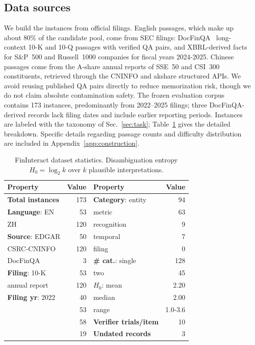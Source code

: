 \subsection{Data sources}
\label{sec:stats}
We build the instances from official filings. English passages, which make up about 80\% of the candidate pool, come from SEC filings: DocFinQA~\citep{reddy2024docfinqa} long-context 10-K and 10-Q passages with verified QA pairs, and XBRL-derived facts for S\&P~500 and Russell~1000 companies for fiscal years 2024-2025. Chinese passages come from the A-share annual reports of SSE~50 and CSI~300 constituents, retrieved through the CNINFO and akshare structured APIs. We avoid reusing published QA pairs directly to reduce memorization risk, though we do not claim absolute contamination safety. The frozen evaluation corpus contains 173 instances, predominantly from 2022--2025 filings; three DocFinQA-derived records lack filing dates and include earlier reporting periods. Instances are labeled with the taxonomy of Sec.~\ref{sec:task}; Table~\ref{tab:stats} gives the detailed breakdown. Specific details regarding passage counts and difficulty distribution are included in Appendix~\ref{app:construction}.

\begin{table}[t]
\centering

\small
\setlength{\tabcolsep}{4pt}
\begin{tabular}{@{}lr@{\hskip 1.5em}lr@{}}
\toprule
Property & Value & Property & Value \\
\midrule
\textbf{Total instances}     & 173 & \textbf{Category}: entity   & 94 \\
\textbf{Language}: EN         & 53  & \quad metric        & 63 \\
\quad ZH             & 120 & \quad recognition   & 9 \\
\textbf{Source}: EDGAR        & 50  & \quad temporal      & 7 \\
\quad CSRC-CNINFO    & 120 & \quad filing        & 0 \\
\quad DocFinQA       & 3   & \textbf{\# cat.}: single     & 128 \\
\textbf{Filing}: 10-K         & 53  & \quad two           & 45 \\
\quad annual report  & 120 & \textbf{$H_0$}: mean         & 2.20 \\
\textbf{Filing yr}: 2022      & 40  & \quad median        & 2.00 \\
\quad 2023           & 53  & \quad range         & 1.0-3.6 \\
\quad 2024           & 58  & \textbf{Verifier trials/item} & 10 \\
\quad 2025           & 19  &  \textbf{Undated records} & 3  \\
\bottomrule
\end{tabular}
\caption{FinInteract dataset statistics. Disambiguation entropy
$H_0=\log_2 k$ over $k$ plausible interpretations.}
\label{tab:stats}
\end{table}

